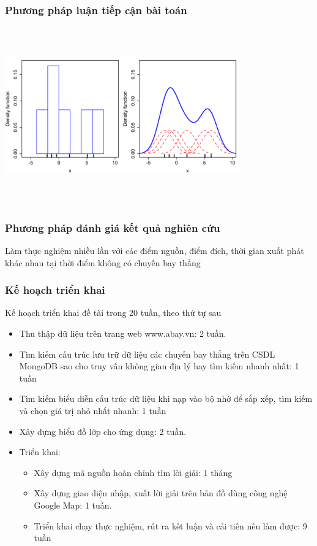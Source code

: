 \documentclass{beamer}
\begin{document}
\begin{frame}
\frametitle{Phương pháp luận tiếp cận bài toán}
\begin{center}
\includegraphics[height=3in,width=4in]{500px-Comparison_of_1D_histogram_and_KDE.png}
\end{center}
\end{frame}

\begin{frame}
\frametitle{Phương pháp đánh giá kết quả nghiên cứu}
Làm thực nghiệm nhiều lần với các điểm nguồn, điểm đích, thời gian xuất phát khác nhau tại thời điểm không có chuyến bay thẳng
\end{frame}


\begin{frame}
\frametitle{Kế hoạch triển khai}
Kế hoạch triển khai đề tài trong 20 tuần,
 theo thứ tự sau

\begin{itemize}
\item Thu thập dữ liệu trên trang web www.abay.vn: 2 tuần.
\item Tìm kiếm cấu trúc lưu trữ dữ liệu các chuyến bay thẳng trên CSDL MongoDB sao cho truy vấn không gian địa lý hay tìm kiếm nhanh nhất: 1 tuần
\item Tìm kiếm biểu diễn cấu trúc dữ liệu khi nạp vào bộ nhớ để sắp xếp, tìm kiếm và chọn giá trị nhỏ nhất nhanh: 1 tuần
\item Xây dựng biểu đồ lớp cho ứng dụng: 2 tuần.
\item Triển khai:
\begin{itemize}
\item Xây dựng mã nguồn hoàn chỉnh tìm lời giải: 1 tháng
\item Xây dựng giao diện nhập, xuất lời giải trên bản đồ dùng công nghệ Google Map: 1 tuần.
\item Triển khai chạy thực nghiệm, rút ra kết luận và cải tiến nếu làm được: 9 tuần
\end{itemize}
\end{itemize}
\end{frame}
\end{document}
